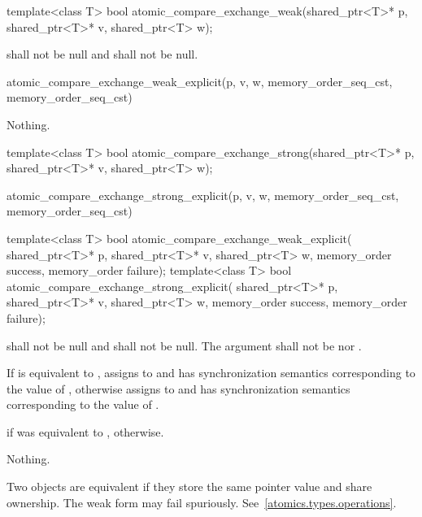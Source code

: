 %
\begin{itemdecl}
template<class T>
  bool atomic_compare_exchange_weak(shared_ptr<T>* p, shared_ptr<T>* v, shared_ptr<T> w);
\end{itemdecl}

\begin{itemdescr}
\pnum
\requires {} shall not be null and  shall not be null.

\pnum
\returns
\begin{codeblock}
atomic_compare_exchange_weak_explicit(p, v, w, memory_order_seq_cst, memory_order_seq_cst)
\end{codeblock}

\pnum
\throws Nothing.
\end{itemdescr}

%
\begin{itemdecl}
template<class T>
  bool atomic_compare_exchange_strong(shared_ptr<T>* p, shared_ptr<T>* v, shared_ptr<T> w);
\end{itemdecl}

\begin{itemdescr}
\pnum
\returns
\begin{codeblock}
atomic_compare_exchange_strong_explicit(p, v, w, memory_order_seq_cst, memory_order_seq_cst)
\end{codeblock}
\end{itemdescr}

%
%
\begin{itemdecl}
template<class T>
  bool atomic_compare_exchange_weak_explicit(
    shared_ptr<T>* p, shared_ptr<T>* v, shared_ptr<T> w,
    memory_order success, memory_order failure);
template<class T>
  bool atomic_compare_exchange_strong_explicit(
    shared_ptr<T>* p, shared_ptr<T>* v, shared_ptr<T> w,
    memory_order success, memory_order failure);
\end{itemdecl}

\begin{itemdescr}
\pnum
\requires {} shall not be null and  shall not be null.
The  argument shall not be  nor
.

\pnum
\effects If  is equivalent to , assigns  to
 and has synchronization semantics corresponding to the value of
, otherwise assigns  to  and has
synchronization semantics corresponding to the value of .

\pnum
\returns {} if  was equivalent to ,  otherwise.

\pnum
\throws Nothing.

\pnum
\remarks Two  objects are equivalent if they store the same
pointer value and share ownership.
The weak form may fail spuriously. See~\ref{atomics.types.operations}.
\end{itemdescr}

